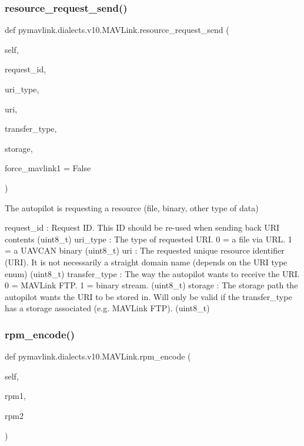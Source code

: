 \begin{DoxyVerb}
\begin{DoxyVerb}
\begin{DoxyVerb}
\begin{DoxyVerb}
\begin{DoxyVerb}
\begin{DoxyVerb}
\begin{DoxyVerb}
\begin{DoxyVerb}
\begin{DoxyVerb}
\begin{DoxyVerb}
\subsubsection{\texorpdfstring{resource\+\_\+request\+\_\+send()}{resource\_request\_send()}}
{\footnotesize\ttfamily def pymavlink.\+dialects.\+v10.\+M\+A\+V\+Link.\+resource\+\_\+request\+\_\+send (\begin{DoxyParamCaption}\item[{}]{self,  }\item[{}]{request\+\_\+id,  }\item[{}]{uri\+\_\+type,  }\item[{}]{uri,  }\item[{}]{transfer\+\_\+type,  }\item[{}]{storage,  }\item[{}]{force\+\_\+mavlink1 = {\ttfamily False} }\end{DoxyParamCaption})}

\begin{DoxyVerb}The autopilot is requesting a resource (file, binary, other type of
data)

request_id                : Request ID. This ID should be re-used when sending back URI contents (uint8_t)
uri_type                  : The type of requested URI. 0 = a file via URL. 1 = a UAVCAN binary (uint8_t)
uri                       : The requested unique resource identifier (URI). It is not necessarily a straight domain name (depends on the URI type enum) (uint8_t)
transfer_type             : The way the autopilot wants to receive the URI. 0 = MAVLink FTP. 1 = binary stream. (uint8_t)
storage                   : The storage path the autopilot wants the URI to be stored in. Will only be valid if the transfer_type has a storage associated (e.g. MAVLink FTP). (uint8_t)\end{DoxyVerb}
 \mbox{\label{classpymavlink_1_1dialects_1_1v10_1_1MAVLink_a143ae067ae1f14db79462ec60e191776}} 
\subsubsection{\texorpdfstring{rpm\+\_\+encode()}{rpm\_encode()}}
{\footnotesize\ttfamily def pymavlink.\+dialects.\+v10.\+M\+A\+V\+Link.\+rpm\+\_\+encode (\begin{DoxyParamCaption}\item[{}]{self,  }\item[{}]{rpm1,  }\item[{}]{rpm2 }\end{DoxyParamCaption})}


\end{DoxyVerb}
\end{DoxyVerb}
\end{DoxyVerb}
\end{DoxyVerb}
\end{DoxyVerb}
\end{DoxyVerb}
\end{DoxyVerb}
\end{DoxyVerb}
\end{DoxyVerb}
\end{DoxyVerb}
